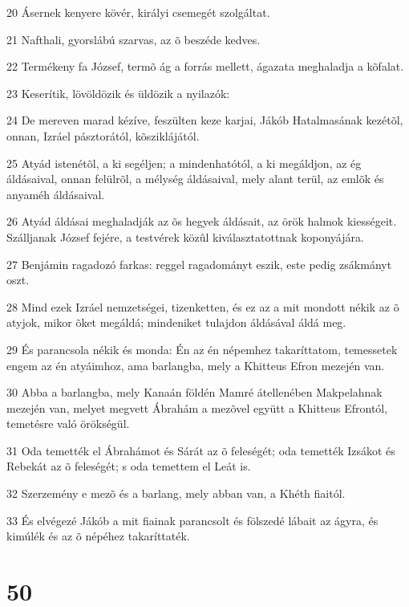 \par 20 Ásernek kenyere kövér, királyi csemegét szolgáltat.
\par 21 Nafthali, gyorslábú szarvas, az õ beszéde kedves.
\par 22 Termékeny fa József, termõ ág a forrás mellett, ágazata meghaladja a kõfalat.
\par 23 Keserítik, lövöldözik és üldözik a nyilazók:
\par 24 De mereven marad kézíve, feszülten keze karjai, Jákób Hatalmasának kezétõl, onnan, Izráel pásztorától, kõsziklájától.
\par 25 Atyád istenétõl, a ki segéljen; a mindenhatótól, a ki megáldjon, az ég áldásaival, onnan felülrõl, a mélység áldásaival, mely alant terül, az emlõk és anyaméh áldásaival.
\par 26 Atyád áldásai meghaladják az õs hegyek áldásait, az örök halmok kiességeit. Szálljanak József fejére, a testvérek közûl kiválasztatottnak koponyájára.
\par 27 Benjámin ragadozó farkas: reggel ragadományt eszik, este pedig zsákmányt oszt.
\par 28 Mind ezek Izráel nemzetségei, tizenketten, és ez az a mit mondott nékik az õ atyjok, mikor õket megáldá; mindeniket tulajdon áldásával áldá meg.
\par 29 És parancsola nékik és monda: Én az én népemhez takaríttatom, temessetek engem az én atyáimhoz, ama barlangba, mely a Khitteus Efron mezején van.
\par 30 Abba a barlangba, mely Kanaán földén Mamré átellenében Makpelahnak mezején van, melyet megvett Ábrahám a mezõvel együtt a Khitteus Efrontól, temetésre való örökségül.
\par 31 Oda temették el Ábrahámot és Sárát az õ feleségét; oda temették Izsákot és Rebekát az õ feleségét; s oda temettem el Leát is.
\par 32 Szerzemény e mezõ és a barlang, mely abban van, a Khéth fiaitól.
\par 33 És elvégezé Jákób a mit fiainak parancsolt és fölszedé lábait az ágyra, és kimúlék és az õ népéhez takaríttaték.

\chapter{50}


